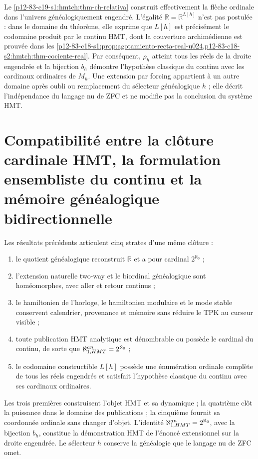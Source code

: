 \begin{remark}
\label{p12-83-c19-s1:hmtch:rem-alcance-relativo}
Le \cref{p12-83-c19-s1:hmtch:thm-ch-relativa} construit effectivement la
flèche ordinale dans l'univers généalogiquement engendré. L'égalité
\(\mathbb R=\mathbb R^{L[h]}\) n'est pas postulée : dans le domaine du théorème,
elle exprime que \(L[h]\) est précisément le codomaine produit par le continu
HMT, dont la couverture archimédienne est prouvée dans les
\cref{p12-83-c18-s1:prop:agotamiento-recta-real-u024,p12-83-c18-s2:hmtch:thm-cociente-real}.
Par conséquent, \(\rho_h\) atteint tous les réels de la droite engendrée et
la bijection \(b_h\) démontre l'hypothèse classique du continu avec les
cardinaux ordinaires de \(M_h\). Une extension par forcing appartient à un autre
domaine après oubli ou remplacement du sélecteur généalogique \(h\) ; elle décrit
l'indépendance du langage nu de ZFC et ne modifie pas la conclusion du
système HMT.
\end{remark}

\section{Compatibilité entre la clôture cardinale HMT, la formulation ensembliste du continu et la mémoire généalogique bidirectionnelle}

Les résultats précédents articulent cinq strates d'une même clôture :
\begin{enumerate}
 \item le quotient généalogique reconstruit \(\mathbb R\) et a pour cardinal
       \(2^{\aleph_0}\) ;
 \item l'extension naturelle two-way et le biordinal généalogique sont
       homéomorphes, avec aller et retour continus ;
 \item le hamiltonien de l'horloge, le hamiltonien modulaire et le mode stable
       conservent calendrier, provenance et mémoire sans réduire le TPK au
       curseur visible ;
 \item toute publication HMT analytique est dénombrable ou possède le cardinal du
       continu, de sorte que
       \(\aleph_{1,\mathrm{HMT}}^{\rm an}=2^{\aleph_0}\) ;
 \item le codomaine constructible \(L[h]\) possède une énumération ordinale
       complète de tous les réels engendrés et satisfait l'hypothèse
       classique du continu avec ses cardinaux ordinaires.
\end{enumerate}
Les trois premières construisent l'objet HMT et sa dynamique ; la quatrième clôt la
puissance dans le domaine des publications ; la cinquième fournit sa coordonnée
ordinale sans changer d'objet. L'identité
\(\aleph_{1,\mathrm{HMT}}^{\rm an}=2^{\aleph_0}\), avec la bijection
\(b_h\), constitue la démonstration HMT de l'énoncé extensionnel sur la
droite engendrée. Le sélecteur \(h\) conserve la généalogie que le langage
nu de ZFC omet.

